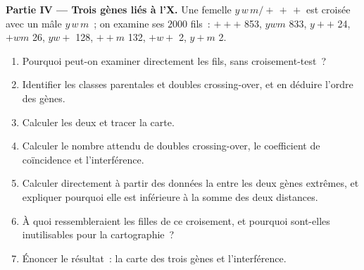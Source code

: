 \begin{problem}
\medskip
\noindent\textbf{Partie IV --- Trois gènes liés à l'X.}
Une femelle $y\,w\,m/+\,+\,+$ est croisée avec un mâle $y\,w\,m$~; on
examine ses $2000$
fils~: $+++$ 853, $ywm$ 833, $y++$ 24, $+wm$ 26, $yw+$ 128,
$++m$ 132, $+w+$ 2, $y+m$ 2.
\begin{enumerate}[resume]
  \item Pourquoi peut-on examiner directement les fils, sans
        croisement-test~?
  \item Identifier les classes parentales et doubles crossing-over, et
        en déduire l'ordre des gènes.
  \item Calculer les deux  et tracer la
        carte.
  \item Calculer le nombre attendu de doubles crossing-over, le
        coefficient de coïncidence et l'interférence.
  \item Calculer directement à partir des données la  entre les deux gènes extrêmes, et expliquer
        pourquoi elle est inférieure à la somme des deux distances.
  \item À quoi ressembleraient les filles de ce croisement, et pourquoi
        sont-elles inutilisables pour la cartographie~?
  \item Énoncer le résultat~: la carte des trois gènes et
        l'interférence.
\end{enumerate}
\end{problem}
